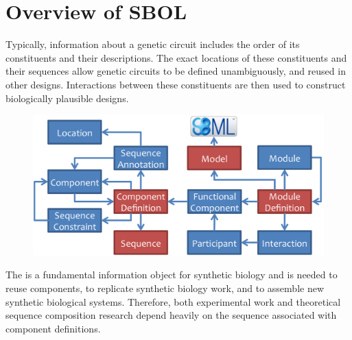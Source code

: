 \section{Overview of SBOL}
Typically, information about a  genetic circuit includes the order of its constituents and their descriptions. The exact locations of these constituents and their sequences allow genetic circuits to be defined unambiguously, and reused in other designs. Interactions between these constituents are then used to construct biologically plausible designs. 


\begin{figure}[ht]
\begin{center}
\includegraphics[scale=1.2]{images/SBOL2_2_revised.png}
\caption[]{ }
\label{images:overview}
\end{center}
\end{figure}

The  is a fundamental information object for synthetic biology and is needed to reuse components, to replicate synthetic biology work, and to assemble new synthetic biological systems. 
Therefore, both experimental work and theoretical sequence composition research depend heavily on the sequence associated with component definitions.


